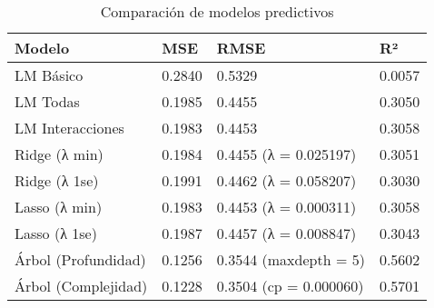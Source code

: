 \begin{table}

\caption{Comparación de modelos predictivos}
\centering
\begin{tabular}[t]{l|l|l|l}
\hline
Modelo & MSE & RMSE & R²\\
\hline
LM Básico & 0.2840 & 0.5329 & 0.0057\\
\hline
LM Todas & 0.1985 & 0.4455 & 0.3050\\
\hline
LM Interacciones & 0.1983 & 0.4453 & 0.3058\\
\hline
Ridge (λ min) & 0.1984 & 0.4455
(λ = 0.025197) & 0.3051\\
\hline
Ridge (λ 1se) & 0.1991 & 0.4462
(λ = 0.058207) & 0.3030\\
\hline
Lasso (λ min) & 0.1983 & 0.4453
(λ = 0.000311) & 0.3058\\
\hline
Lasso (λ 1se) & 0.1987 & 0.4457
(λ = 0.008847) & 0.3043\\
\hline
Árbol (Profundidad) & 0.1256 & 0.3544
(maxdepth = 5) & 0.5602\\
\hline
Árbol (Complejidad) & 0.1228 & 0.3504
(cp = 0.000060) & 0.5701\\
\hline
\end{tabular}
\end{table}
